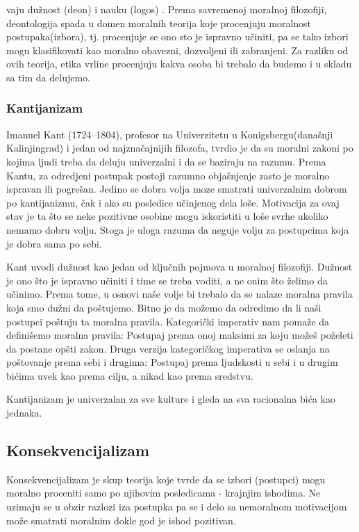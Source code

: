 \documentclass[a4paper]{article}
\begin{document}
vaju dužnost (deon) i nauku (logos) \cite{stanford}. Prema savremenoj moralnoj filozofiji, deontologija spada u domen moralnih teorija koje procenjuju moralnost postupaka(izbora), tj. procenjuje se ono sto je ispravno učiniti, pa se tako izbori mogu klasifikovati kao moralno obavezni, dozvoljeni ili zabranjeni. Za razliku od ovih teorija, etika vrline procenjuju kakva osoba bi trebalo da budemo i u skladu sa tim da delujemo. 

\subsubsection{Kantijanizam}

Imanuel Kant (1724–1804), profesor na Univerzitetu u Konigsbergu(današnji Kalinjingrad) i jedan od najznačajnijih filozofa, tvrdio je da su moralni zakoni po kojima ljudi treba da deluju univerzalni i da se baziraju na razumu. 
Prema Kantu, za odredjeni postupak postoji razumno objašnjenje zasto je moralno ispravan ili pogrešan.
Jedino se dobra volja moze smatrati univerzalnim dobrom po kantijanizmu, čak i ako su posledice učinjenog dela loše.
Motivacija za ovaj stav je ta što se neke pozitivne osobine mogu iskoristiti u loše svrhe ukoliko nemamo dobru volju.
Stoga je uloga razuma da neguje volju za postupcima koja je dobra sama po sebi.

Kant uvodi dužnost kao jedan od ključnih pojmova u moralnoj filozofiji. Dužnost je ono što je ispravno učiniti i time se treba voditi, a ne onim što želimo da učinimo.
Prema tome, u osnovi naše volje bi trebalo da se nalaze moralna pravila koja smo dužni da poštujemo. Bitno je da možemo da odredimo da li naši postupci poštuju ta moralna pravila.
Kategorički imperativ nam pomaže da definišemo moralna pravila: Postupaj prema onoj maksimi za koju možeš poželeti da postane opšti zakon.
Druga verzija kategoričkog imperativa se oslanja na poštovanje prema sebi i drugima: Postupaj prema ljudskosti u sebi i u drugim bićima uvek kao prema cilju, a nikad kao prema sredstvu.

Kantijanizam je univerzalan za sve kulture i gleda na sva racionalna bića kao jednaka.

\subsection{Konsekvencijalizam}
Konsekvencijalizam je skup teorija koje tvrde da se izbori (postupci) mogu moralno proceniti samo po njihovim posledicama - krajnjim ishodima. Ne uzimaju se u obzir razlozi iza postupka pa se i delo sa nemoralnom motivacijom može smatrati moralnim dokle god je ishod pozitivan. 
\end{document}
